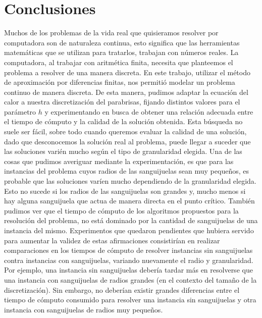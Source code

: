 \section{Conclusiones}
Muchos de los problemas de la vida real que quisieramos resolver por computadora son de naturaleza continua, esto significa que las herramientas matemáticas que se utilizan para tratarlos, trabajan con números reales. La computadora, al trabajar con aritmética finita, necesita que planteemos el problema a resolver de una manera discreta. En este trabajo, utilizar el método de aproximación por diferencias finitas, nos permitió modelar un problema continuo de manera discreta. De esta manera, pudimos adaptar la ecuación del calor a nuestra discretización del parabrisas, fijando distintos valores para el parámetro $h$ y experimentando en busca de obtener una relación adecuada entre el tiempo de cómputo y la calidad de la solución obtenida. Esta búsqueda no suele ser fácil, sobre todo cuando queremos evaluar la calidad de una solución, dado que desconocemos la solución real al problema, puede llegar a suceder que las soluciones varién mucho según el tipo de granularidad elegida. Una de las cosas que pudimos averiguar mediante la experimentación, es que para las instancias del problema cuyos radios de las sanguijuelas sean muy pequeños, es probable que las soluciones varíen mucho dependiendo de la granularidad elegida. Esto no sucede si los radios de las sanguijuelas son grandes y, mucho menos si hay alguna sanguijuela que actua de manera directa en el punto crítico. También pudimos ver que el tiempo de cómputo de los algoritmos propuestos para la resolución del problema, no está dominado por la cantidad de sanguijuelas de una instancia del mismo. Experimentos que quedaron pendientes que hubiera servido para aumentar la validez de estas afirmaciones consistirían en realizar comparaciones en los tiempos de cómputo de resolver instancias sin sanguijuelas contra instancias con sanguijuelas, variando nuevamente el radio y granularidad. Por ejemplo, una instancia sin sanguijuelas debería tardar más en resolverse que una instancia con sanguijuelas de radios grandes (en el contexto del tamaño de la discretización). Sin embargo, no deberían existir grandes diferencias entre el tiempo de cómputo consumido para resolver una instancia sin sanguijuelas y otra instancia con sanguijuelas de radios muy pequeños.